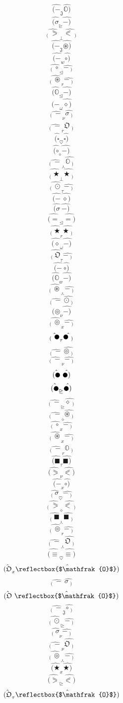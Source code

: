 \documentclass[12pt]{article}
\begin{document}
\begin{multicols}{5}
$$\hat{(-} _\mathfrak{J} \hat{\mathbb{O})}$$
$$\hat{(\sigma} _\trianglerighteq \hat{-)}$$
$$\hat{_( \ \eqslantgtr} _\bot \hat{\eqslantless\ _)}$$
$$\hat{(-} _\mathfrak{J} \hat{\circledast)}$$
$$\hat{(-} _w \hat{\circ)}$$
$$\hat{_( \ \circ} _\trianglelefteq \hat{-\ _)}$$
$$\hat{_( \ \circledast} _r \hat{-\ _)}$$
$$\hat{(\mathbb{O}} _\trianglelefteq \hat{-)}$$
$$\hat{(-} _\omega \hat{\diamond)}$$
$$\hat{_( \ -} _\nu \hat{\sigma\ _)}$$
$$\hat{_( \ -} _r \hat{\mathfrak{O}\ _)}$$
$$\hat{(\square} _\heartsuit \hat{\square)}$$
$$\hat{(\circ} _\diamond \hat{-)}$$
$$\hat{_( \ -} _\curlywedge \hat{\mathbb{O}\ _)}$$
$$\hat{_( \ \bigstar} _\bot \hat{\bigstar\ _)}$$
$$\hat{_( \ \odot} _\tau \hat{-\ _)}$$
$$\hat{(-} \  \hat{\diamond)}$$
$$\hat{(\sigma} \  \hat{-)}$$
$$\hat{(=} _\trianglelefteq \hat{=)}$$
$$\hat{_( \ \bigstar} _r \hat{\bigstar\ _)}$$
$$\hat{(\diamond} _\omega \hat{-)}$$
$$\hat{_( \ \mathfrak{O}} _\tau \hat{-\ _)}$$
$$\hat{(-} \  \hat{\circ)}$$
$$\hat{(\mathbb{O}} _w \hat{-)}$$
$$\hat{_( \ \circledast} _\curlywedge \hat{-\ _)}$$
$$\hat{_( \ -} \  \hat{\odot\ _)}$$
$$\hat{(\circledcirc} _\nu \hat{-)}$$
$$\hat{_( \ \circledcirc} _x \hat{-\ _)}$$
$$\hat{_( \ \newmoon} _\tau \hat{\newmoon\ _)}$$
$$\hat{_( \ -} \  \hat{\circledcirc\ _)}$$
$$\hat{_( \ -} _\nu \hat{-\ _)}$$
$$\hat{(\newmoon} \  \hat{\newmoon)}$$
$$\hat{(\newmoon} _\trianglerighteq \hat{\newmoon)}$$
$$\hat{_( \ -} _\trianglerighteq \hat{\diamond\ _)}$$
$$\hat{_( \ -} _\diamond \hat{\circledast\ _)}$$
$$\hat{_( \ \circ} _x \hat{-\ _)}$$
$$\hat{_( \ \circledast} _x \hat{-\ _)}$$
$$\hat{_( \ -} _r \hat{\mathbb{O}\ _)}$$
$$\hat{(\blacksquare} _\tau \hat{\blacksquare)}$$
$$\hat{(\eqslantgtr} _\nu \hat{\eqslantless)}$$
$$\hat{(-} _x \hat{\circ)}$$
$$\hat{_( \ \sigma} _\heartsuit \hat{-\ _)}$$
$$\hat{_( \ \eqslantgtr} _\diamond \hat{\eqslantless\ _)}$$
$$\hat{_( \ \blacksquare} _\curlywedge \hat{\blacksquare\ _)}$$
$$\hat{_( \ \circledcirc} _r \hat{-\ _)}$$
$$\hat{_( \ -} _\curlywedge \hat{\mathfrak{O}\ _)}$$
$$\hat{(\equiv} _\heartsuit \hat{\equiv)}$$
$$\hat{(\mathfrak{O}} _x \hat{\reflectbox{$\mathfrak{O}$})}$$
$$\hat{_( \ -} \  \hat{\sigma\ _)}$$
$$\hat{(\mathfrak{O}} \  \hat{\reflectbox{$\mathfrak{O}$})}$$
$$\hat{_( \ -} _\mathfrak{J} \hat{\circ\ _)}$$
$$\hat{_( \ \odot} _\trianglerighteq \hat{-\ _)}$$
$$\hat{_( \ \sigma} _\nu \hat{-\ _)}$$
$$\hat{_( \ -} _\nu \hat{\mathfrak{O}\ _)}$$
$$\hat{_( \ \circledcirc} _\curlywedge \hat{-\ _)}$$
$$\hat{(\bigstar} _x \hat{\bigstar)}$$
$$\hat{(\eqslantgtr} _\trianglerighteq \hat{\eqslantless)}$$
$$\hat{(\mathfrak{O}} _\tau \hat{\reflectbox{$\mathfrak{O}$})}$$

\end{multicols}
\end{document}
